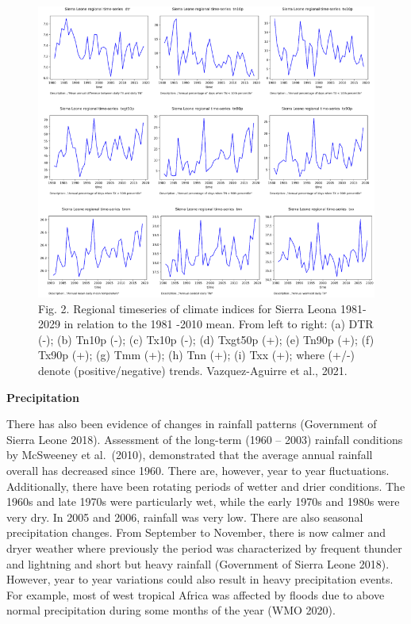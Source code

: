 \documentclass[
]{book}
\begin{document}
\begin{figure}
\centering
\includegraphics{images/indices.png}
\caption{Fig. 2. Regional timeseries of climate indices for Sierra Leona 1981-2029 in relation to the 1981 -2010 mean. From left to right: (a) DTR (-); (b) Tn10p (-); (c) Tx10p (-); (d) Txgt50p (+); (e) Tn90p (+); (f) Tx90p (+); (g) Tmm (+); (h) Tnn (+); (i) Txx (+); where (+/-) denote (positive/negative) trends. Vazquez-Aguirre et al., 2021.}
\end{figure}

\textbf{Precipitation}

There has also been evidence of changes in rainfall patterns (Government of Sierra Leone 2018). Assessment of the long-term (1960 -- 2003) rainfall conditions by McSweeney et al.~(2010), demonstrated that the average annual rainfall overall has decreased since 1960. There are, however, year to year fluctuations. Additionally, there have been rotating periods of wetter and drier conditions. The 1960s and late 1970s were particularly wet, while the early 1970s and 1980s were very dry. In 2005 and 2006, rainfall was very low. There are also seasonal precipitation changes. From September to November, there is now calmer and dryer weather where previously the period was characterized by frequent thunder and lightning and short but heavy rainfall (Government of Sierra Leone 2018). However, year to year variations could also result in heavy precipitation events. For example, most of west tropical Africa was affected by floods due to above normal precipitation during some months of the year (WMO 2020).
\end{document}
